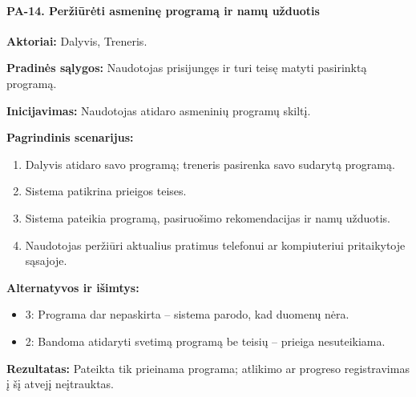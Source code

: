 \paragraph{PA-14. Peržiūrėti asmeninę programą ir namų užduotis}\mbox{}\par
\textbf{Aktoriai:} Dalyvis, Treneris.\par
\textbf{Pradinės sąlygos:} Naudotojas prisijungęs ir turi teisę matyti pasirinktą programą.\par
\textbf{Inicijavimas:} Naudotojas atidaro asmeninių programų skiltį.\par
\textbf{Pagrindinis scenarijus:}
\begin{enumerate}
\item Dalyvis atidaro savo programą; treneris pasirenka savo sudarytą programą.
\item Sistema patikrina prieigos teises.
\item Sistema pateikia programą, pasiruošimo rekomendacijas ir namų užduotis.
\item Naudotojas peržiūri aktualius pratimus telefonui ar kompiuteriui pritaikytoje sąsajoje.
\end{enumerate}
\textbf{Alternatyvos ir išimtys:}
\begin{itemize}
\item 3: Programa dar nepaskirta -- sistema parodo, kad duomenų nėra.
\item 2: Bandoma atidaryti svetimą programą be teisių -- prieiga nesuteikiama.
\end{itemize}
\textbf{Rezultatas:} Pateikta tik prieinama programa; atlikimo ar progreso registravimas į šį atvejį neįtrauktas.\par
{}
